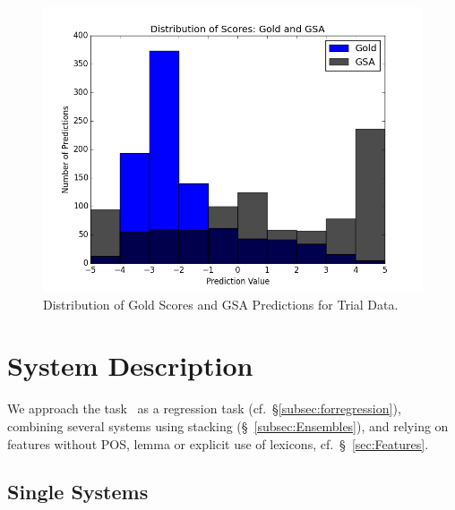 \documentclass[11pt,letterpaper]{article}
\begin{document}
\begin{figure}[ht!]
    \centering
    \includegraphics[width=\columnwidth]{gold_gsa_distributions3.png}%
    \caption{Distribution of Gold Scores and GSA Predictions for Trial Data.}
    \label{fig:TrialGoldGSADist}
\end{figure}



\section{System Description}
We approach the task~\cite{semevalTask11} as a regression task (cf.\ \S \ref{subsec:forregression}), combining several systems using stacking (\S~\ref{subsec:Ensembles}), and relying on features without POS, lemma or explicit use of lexicons, cf.\ \S~\ref{sec:Features}. %


\subsection{Single Systems}
\label{subsec:SingleSystems}
\end{document}
